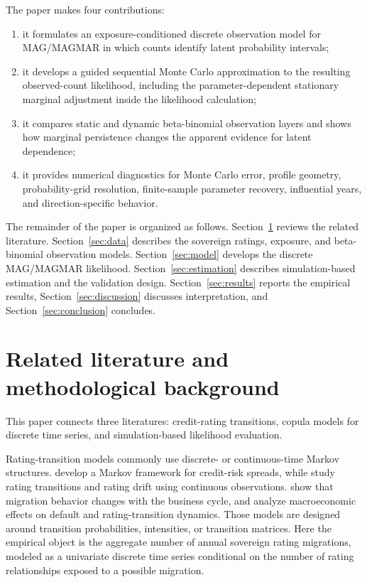 \documentclass[11pt]{article}
\theoremstyle{definition}
\begin{document}
The paper makes four contributions:
\begin{enumerate}[leftmargin=2em]
    \item it formulates an exposure-conditioned discrete observation model for
    MAG/MAGMAR in which counts identify latent probability intervals;
    \item it develops a guided sequential Monte Carlo approximation to the resulting
    observed-count likelihood, including the parameter-dependent stationary marginal
    adjustment inside the likelihood calculation;
    \item it compares static and dynamic beta-binomial observation layers and shows
    how marginal persistence changes the apparent evidence for latent dependence;
    \item it provides numerical diagnostics for Monte Carlo error, profile geometry,
    probability-grid resolution, finite-sample parameter recovery, influential
    years, and direction-specific behavior.
\end{enumerate}

The remainder of the paper is organized as follows. Section~\ref{sec:literature}
reviews the related literature. Section~\ref{sec:data} describes the sovereign
ratings, exposure, and beta-binomial observation models. Section~\ref{sec:model}
develops the discrete MAG/MAGMAR likelihood. Section~\ref{sec:estimation} describes
simulation-based estimation and the validation design. Section~\ref{sec:results}
reports the empirical results, Section~\ref{sec:discussion} discusses interpretation,
and Section~\ref{sec:conclusion} concludes.

\section{Related literature and methodological background}
\label{sec:literature}

This paper connects three literatures: credit-rating transitions, copula models for
discrete time series, and simulation-based likelihood evaluation.

Rating-transition models commonly use discrete- or continuous-time Markov
structures. \citet{jarrow1997} develop a Markov framework for credit-risk spreads,
while \citet{lando2002} study rating transitions and rating drift using continuous
observations. \citet{bangia2002} show that migration behavior changes with the
business cycle, and \citet{figlewski2012} analyze macroeconomic effects on default
and rating-transition dynamics. Those models are designed around transition
probabilities, intensities, or transition matrices. Here the empirical object is the
aggregate number of annual sovereign rating migrations, modeled as a univariate
discrete time series conditional on the number of rating relationships exposed to a
possible migration.
\end{document}
